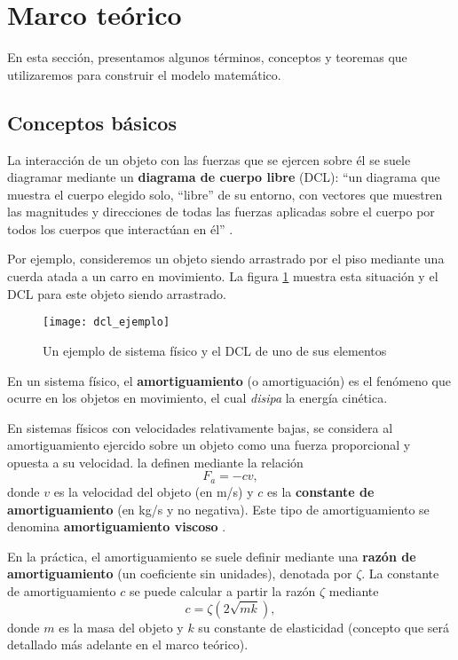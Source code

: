 \section{Marco teórico}

En esta sección, presentamos algunos términos, conceptos y teoremas que utilizaremos para construir el modelo matemático.

\subsection{Conceptos básicos}

La interacción de un objeto con las fuerzas que se ejercen sobre él se suele diagramar mediante un \textbf{diagrama de cuerpo libre} (DCL): ``un diagrama que muestra el cuerpo elegido solo, ``libre'' de su entorno, con vectores que muestren las magnitudes y direcciones de todas las fuerzas aplicadas sobre el cuerpo por todos los cuerpos que interactúan en él'' \citep{young}.

Por ejemplo, consideremos un objeto siendo arrastrado por el piso mediante una cuerda atada a un carro en movimiento. La figura \ref{fig:dcl-ejemplo} muestra esta situación y el DCL para este objeto siendo arrastrado.

\begin{figure}[h]
    \centering
    \texttt{[image: dcl\_ejemplo]}
    \caption{Un ejemplo de sistema físico y el DCL de uno de sus elementos}
    \label{fig:dcl-ejemplo}
\end{figure}

\begin{definition}[amortiguamiento]
    En un sistema físico, el \textbf{amortiguamiento} (o amortiguación) es el fenómeno que ocurre en los objetos en movimiento, el cual \textit{disipa} la energía cinética.
\end{definition}

En sistemas físicos con velocidades relativamente bajas, se considera al amortiguamiento ejercido sobre un objeto como una fuerza proporcional y opuesta a su velocidad. \citet{rak} la definen mediante la relación
\[
    F_{a} = -cv
,\]
donde \(v\) es la velocidad del objeto (en \si{m/s}) y \(c\) es la \textbf{constante de amortiguamiento} (en \si{kg/s} y no negativa). Este tipo de amortiguamiento se denomina \textbf{amortiguamiento viscoso} \citep{rak}.

En la práctica, el amortiguamiento se suele definir mediante una \textbf{razón de amortiguamiento} (un coeficiente sin unidades), denotada por \(\zeta\). La constante de amortiguamiento \(c\) se puede calcular a partir la razón \(\zeta\) mediante
\[
    c = \zeta \left( 2\sqrt{mk} \right)
,\]
donde \(m\) es la masa del objeto y \(k\) su constante de elasticidad (concepto que será detallado más adelante en el marco teórico).

